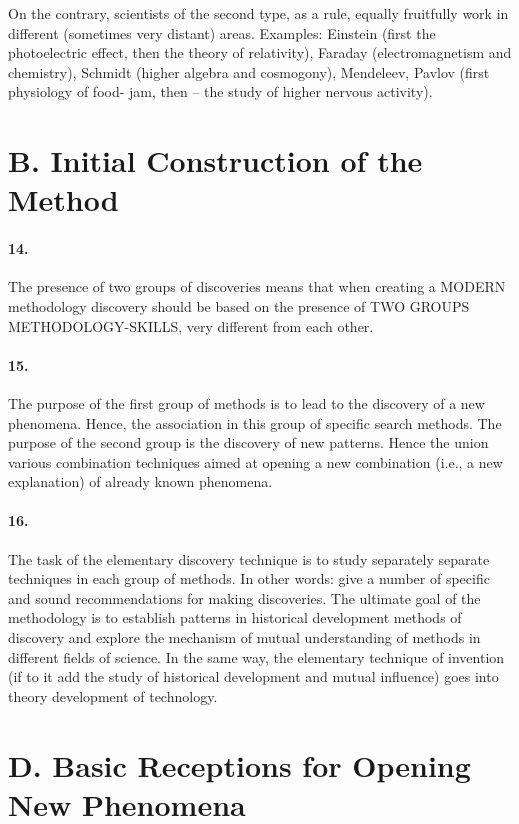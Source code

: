 \documentclass[11pt,a4paper]{article}
\begin{document}
On the contrary, scientists of the second type, as a rule, equally fruitfully
work in different (sometimes very distant) areas. Examples: Einstein (first
the photoelectric effect, then the theory of relativity), Faraday
(electromagnetism and chemistry), Schmidt (higher algebra and cosmogony),
Mendeleev, Pavlov (first physiology of food- jam, then -- the study of higher
nervous activity).

\section*{B. Initial Construction of the Method}

\paragraph{14.}
The presence of two groups of discoveries means that when creating a MODERN
methodology discovery should be based on the presence of TWO GROUPS
METHODOLOGY-SKILLS, very different from each other.

\paragraph{15.}
The purpose of the first group of methods is to lead to the discovery of a new
phenomena. Hence, the association in this group of specific search methods.
The purpose of the second group is the discovery of new patterns. Hence the
union various combination techniques aimed at opening a new combination (i.e.,
a new explanation) of already known phenomena.

\paragraph{16.}
The task of the elementary discovery technique is to study separately separate
techniques in each group of methods. In other words: give a number of specific
and sound recommendations for making discoveries.  The ultimate goal of the
methodology is to establish patterns in historical development methods of
discovery and explore the mechanism of mutual understanding of methods in
different fields of science. In the same way, the elementary technique of
invention (if to it add the study of historical development and mutual
influence) goes into theory development of technology.

\section*{D. Basic Receptions for Opening New Phenomena}
\end{document}
